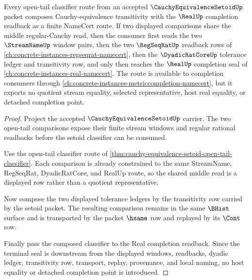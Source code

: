 \begin{theorem}
\label{thm:cauchy-equivalence-setoid-open-tail-transitivity}
Every open-tail classifier route from an accepted $\CauchyEquivalenceSetoidUp$ packet composes Cauchy-equivalence transitivity with the $\RealUp$ completion readback as a finite NameCert route. If two displayed comparisons share the middle regular-Cauchy read, then the consumer first reads the two $\StreamNameUp$ window pairs, then the two $\RegSeqRatUp$ readback rows of \autoref{ch:concrete-instances-regseqrat-namecert}, then the $\DyadicRatCoreUp$ tolerance ledger and transitivity row, and only then reaches the $\RealUp$ completion seal of \autoref{ch:concrete-instances-real-namecert}. The route is available to completion consumers through \autoref{ch:concrete-instances-metriccompletion-namecert}, but it exports no quotient stream equality, selected representative, host real equality, or detached completion point.
\end{theorem}
\begin{proof}
Project the accepted $\CauchyEquivalenceSetoidUp$ carrier. The two open-tail comparisons expose their finite stream windows and regular rational readbacks before the setoid classifier can be consumed.

Use the open-tail classifier route of \autoref{thm:cauchy-equivalence-setoid-open-tail-classifier}. Each comparison is already constrained to the same StreamName, RegSeqRat, DyadicRatCore, and RealUp route, so the shared middle read is a displayed row rather than a quotient representative.

Now compose the two displayed tolerance ledgers by the transitivity row carried by the setoid packet. The resulting comparison remains in the same $\BHist$ surface and is transported by the packet $\hsame$ row and replayed by its $\Cont$ row.

Finally pass the composed classifier to the Real completion readback. Since the terminal seal is downstream from the displayed windows, readbacks, dyadic ledger, transitivity row, transport, replay, provenance, and local naming, no host equality or detached completion point is introduced.
\end{proof}

